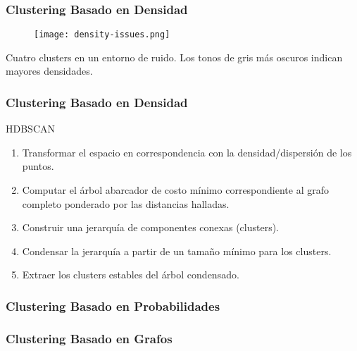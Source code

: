 \begin{frame}
    \frametitle{Clustering Basado en Densidad}

    \begin{figure}[!h]
        \centering
        \texttt{[image: density-issues.png]}
    \end{figure}

    {\footnotesize
    Cuatro clusters en un entorno de ruido.
    Los tonos de gris más oscuros indican mayores densidades.
    }

\end{frame}

\begin{frame}
    \frametitle{Clustering Basado en Densidad}

    \begin{block}{HDBSCAN}
        \begin{enumerate}
            \item<2-> Transformar el espacio en correspondencia con la densidad/dispersión de los puntos.
            \item<3-> Computar el árbol abarcador de costo mínimo correspondiente al grafo completo ponderado por las distancias halladas.
            \item<4-> Construir una jerarquía de componentes conexas (clusters).
            \item<5-> Condensar la jerarquía a partir de un tamaño mínimo para los clusters.
            \item<6-> Extraer los clusters estables del árbol condensado.
        \end{enumerate}
    \end{block}

\end{frame}

\begin{frame}
    \frametitle{Clustering Basado en Probabilidades}

\end{frame}

\begin{frame}
    \frametitle{Clustering Basado en Grafos}

\end{frame}